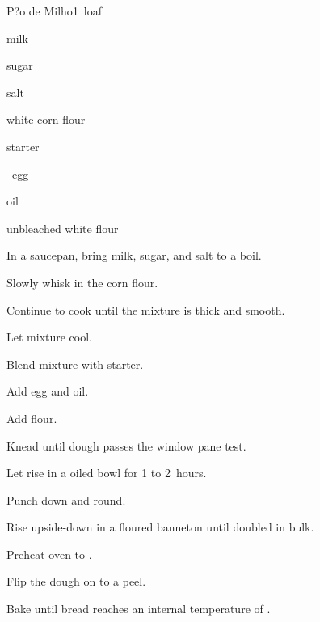 \begin{recipe}{P?o de Milho}{}{1~loaf}

\begin{ingredients}
\item {} milk
\item \C{\quarter} sugar
\item {} salt
\item {} white corn flour
\item {} starter
\item \half{}~egg
\item {} oil
\item {} unbleached white flour
\end{ingredients}

\begin{directions}
\item In a saucepan, bring milk, sugar, and salt to a boil.
\item Slowly whisk in the corn flour.
\item Continue to cook until the mixture is thick and smooth.
\item Let mixture cool.
\item Blend mixture with starter.
\item Add egg and oil.
\item Add flour.
\item Knead until dough passes the window pane test.
\item Let rise in a oiled bowl for 1 to 2~hours.
\item Punch down and round.
\item Rise upside-down in a floured banneton until doubled in bulk.
\item Preheat oven to .
\item Flip the dough on to a peel.
\item Bake until bread reaches an internal temperature of .
\end{directions}

\end{recipe}
